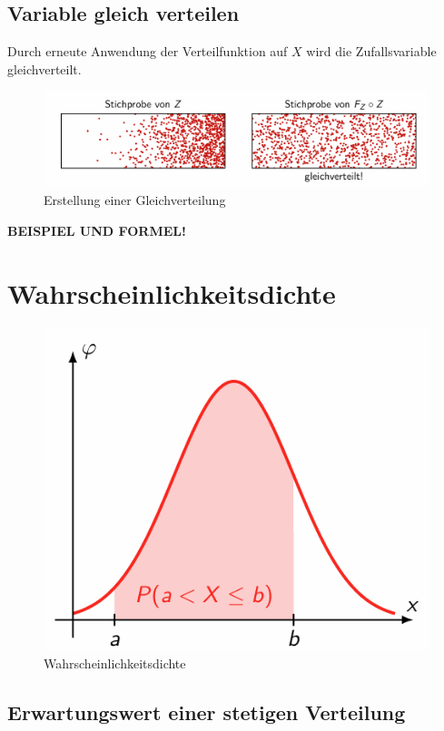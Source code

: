 \documentclass[../Main.tex]{subfiles}
\begin{document}
\subsection{Variable gleich verteilen}
Durch erneute Anwendung der Verteilfunktion auf \(X\) wird die Zufallsvariable 
gleichverteilt.
\begin{figure}[H]
    \centering
    \includegraphics[width=0.75\linewidth]{Images/f_zaufz.png}
    \caption{Erstellung einer Gleichverteilung}
\end{figure}
\textbf{BEISPIEL UND FORMEL!}

\section{Wahrscheinlichkeitsdichte}
\begin{figure}[H]
    \centering
    \includegraphics[width=0.5\linewidth]{Images/wahrscheinlichkeitsdichte.png}
    \caption{Wahrscheinlichkeitsdichte}
    \label{fig:enter-label}
\end{figure}

\subsection{Erwartungswert einer stetigen Verteilung}
\end{document}
